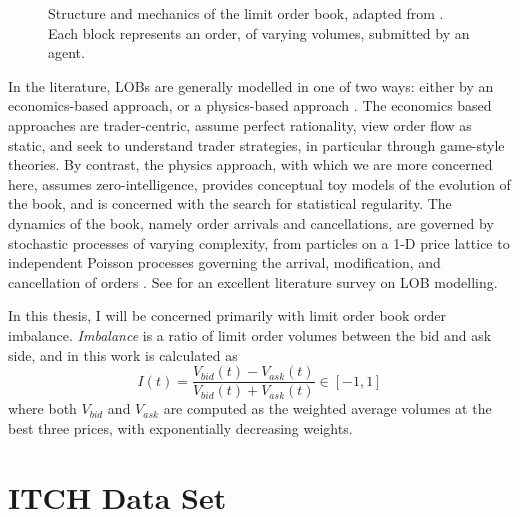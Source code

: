 \begin{figure}
  
\caption{Structure and mechanics of the limit order book, adapted from \citet{Booth15}. Each block represents an order, of varying volumes, submitted by an agent.}
\label{fig:LOB}
\end{figure}

In the literature, LOBs are generally modelled in one of two ways: either by an economics-based approach, or a physics-based approach \citep{Summary2013}. The economics based approaches are trader-centric, assume perfect rationality, view order flow as static, and seek to understand trader strategies, in particular through game-style theories. By contrast, the physics approach, with which we are more concerned here, assumes zero-intelligence, provides conceptual toy models of the evolution of the book, and is concerned with the search for statistical regularity. The dynamics of the book, namely order arrivals and cancellations, are governed by stochastic processes of varying complexity, from particles on a 1-D price lattice \citep{Bak97} to independent Poisson processes governing the arrival, modification, and cancellation of orders \citep{Cont10}. See \citet{Summary2013} for an excellent literature survey on LOB modelling.

In this thesis, I will be concerned primarily with limit order book order imbalance. \emph{Imbalance} is a ratio of limit order volumes between the bid and ask side, and in this work is calculated as 
\begin{equation}\label{eq:LOBImbalance}
I(t) = \dfrac{V_{bid}(t) - V_{ask}(t)}{V_{bid}(t) + V_{ask}(t)} \in [-1,1]
\end{equation}
where both $V_{bid}$ and $V_{ask}$ are computed as the weighted average volumes at the best three prices, with exponentially decreasing weights.

\section{ITCH Data Set}
